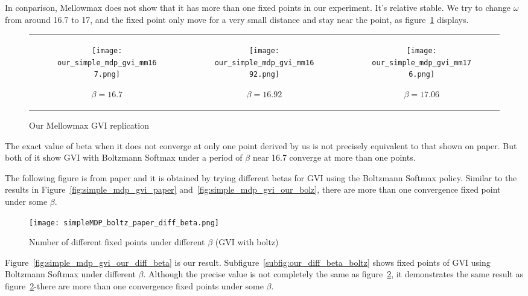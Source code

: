 In conparison, Mellowmax does not show that it has more than one fixed points in our experiment.
It's relative stable. We try to change $\omega$ from around 16.7 to 17, and 
the fixed point only move for a very small distance and stay near the point, as figure\ \ref{fig:simple_mdp_gvi_our_mm} displays.

{\centering
\begin{figure}[H]
\begin{tabular}{ccc}
\begin{subfigure}{0.33\textwidth}\centering\texttt{[image: our\_simple\_mdp\_gvi\_mm167.png]}\caption{$\beta=16.7$}\end{subfigure}&
\begin{subfigure}{0.33\textwidth}\centering\texttt{[image: our\_simple\_mdp\_gvi\_mm1692.png]}\caption{$\beta=16.92$}\end{subfigure}&
\begin{subfigure}{0.33\textwidth}\centering\texttt{[image: our\_simple\_mdp\_gvi\_mm176.png]}\caption{$\beta=17.06$}\end{subfigure}\\
\end{tabular}
\caption{Our Mellowmax GVI replication}\label{fig:simple_mdp_gvi_our_mm}
\end{figure}}

The exact value of beta when it does not converge at only one point 
derived by us is not precisely equivalent to that shown on paper. 
But both of it show GVI with Boltzmann Softmax under a period of $\beta$ 
near 16.7 converge at more than one points.


The following figure is from paper and it is obtained by trying different betas for GVI using the Boltzmann Softmax policy. 
Similar to the results in Figure\ \ref{fig:simple_mdp_gvi_paper} and\ \ref{fig:simple_mdp_gvi_our_bolz},
there are more than one convergence fixed point under some $\beta$.

\begin{figure}[H]
    \centering
    \texttt{[image: simpleMDP\_boltz\_paper\_diff\_beta.png]}
    \caption{Number of different fixed points under different $\beta$ (GVI with boltz)}\label{fig:simple_mdp_boltz_paper_diff_beta}
\end{figure}

Figure\ \ref{fig:simple_mdp_gvi_our_diff_beta} is our result. 
Subfigure\ \ref{subfig:our_diff_beta_boltz} shows fixed points of GVI using Boltzmann Softmax 
under different $\beta$. Although the precise value is not completely the same as figure\ \ref{fig:simple_mdp_boltz_paper_diff_beta},
it demonstrates the same result as figure\ \ref{fig:simple_mdp_boltz_paper_diff_beta}-there are more than one convergence fixed points under some $\beta$.

